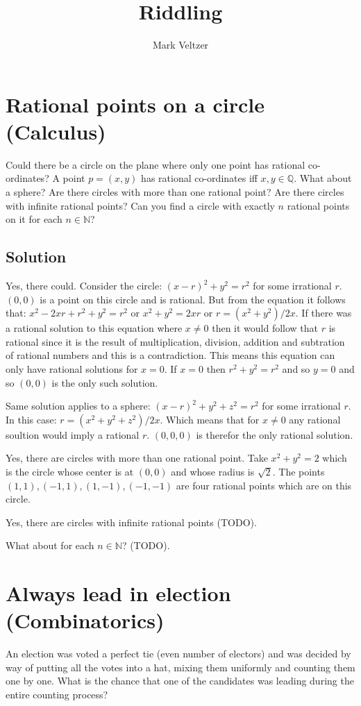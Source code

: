 \documentclass{article}
\title{Riddling}
\author{Mark Veltzer}
\begin{document}
\maketitle

\tableofcontents

\section{Rational points on a circle (Calculus)}
Could there be a circle on the plane where only one point has rational co-ordinates? A point $p=(x,y)$ has rational co-ordinates iff $x,y\in\mathbb{Q}$. What about a sphere? Are there circles with more than one rational point? Are there circles with infinite rational points? Can you find a circle with exactly $n$ rational points on it for each $n\in\mathbb{N}$?

\subsection{Solution}
Yes, there could. Consider the circle: $(x-r)^2+y^2=r^2$ for some irrational $r$.
$(0,0)$ is a point on this circle and is rational. But from the equation it follows
that: $x^2-2xr+r^2+y^2=r^2$ or $x^2+y^2=2xr$ or $r=(x^2+y^2)/2x$. If there
was a rational solution to this equation where $x\ne0$ then it would follow that
$r$ is rational since it is the result of multiplication, division, addition and subtration
of rational numbers and this is a contradiction. This means this equation can only
have rational solutions for $x=0$. If $x=0$ then $r^2+y^2=r^2$ and so $y=0$ and so
$(0,0)$ is the only such solution.

Same solution applies to a sphere: $(x-r)^2+y^2+z^2=r^2$ for some irrational $r$.
In this case: $r=(x^2+y^2+z^2)/2x$. Which means that for $x\ne0$ any rational soultion would imply a rational $r$.
$(0,0,0)$ is therefor the only rational solution.

Yes, there are circles with more than one rational point. Take $x^2+y^2=2$ which is the circle whose
center is at $(0,0)$ and whose radius is $\sqrt{2}$. The points $(1,1),(-1,1),(1,-1),(-1,-1)$ are four rational
points which are on this circle.

Yes, there are circles with infinite rational points (TODO).

What about for each $n\in\mathbb{N}$? (TODO).

\section{Always lead in election (Combinatorics)}
An election was voted a perfect tie (even number of electors) and was decided by way of putting
all the votes into a hat, mixing them uniformly and counting them one by one. What is the chance
that one of the candidates was leading during the entire counting process?
\end{document}
